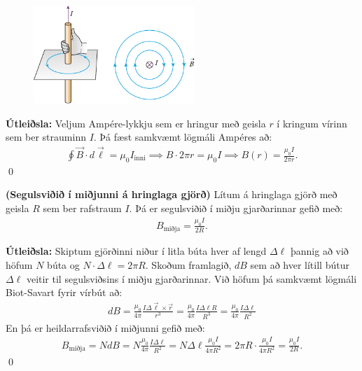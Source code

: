 \ifdefined \wholebook \else\documentclass[oneside]{book}\usepackage{EdlBook}\graphicspath{{figures/}}
\begin{document}
\begin{minipage}{\linewidth}

\begin{figure}
\vspace{-0.5cm}
\includegraphics[width = 2.4in]{figures/ampere2.pdf}
\end{figure}

\textbf{Útleiðsla:} Veljum Ampére-lykkju sem er hringur með geisla $r$ í kringum vírinn sem ber strauminn $I$. Þá fæst samkvæmt lögmáli Ampéres að:
\begin{align*}
    \oint \vec{B} \cdot d\vec{\ell} = \mu_0 I_{\text{inni}} \implies B \cdot 2\pi r = \mu_0 I \implies B(r) = \frac{\mu_0 I}{2\pi r}.
\end{align*}
\qed
\end{minipage}

\vspace{1.5cm}

\begin{tcolorbox}
\begin{theorem}
\textbf{(Segulsviðið í miðjunni á hringlaga gjörð)} Lítum á hringlaga gjörð með geisla $R$ sem ber rafstraum $I$. Þá er segulsviðið í miðju gjarðarinnar gefið með:
\begin{align*}
    B_{\text{miðja}} = \frac{\mu_0 I}{2R}.
\end{align*}
\end{theorem}
\end{tcolorbox}


\textbf{Útleiðsla:} Skiptum gjörðinni niður í litla búta hver af lengd $\Delta \ell$ þannig að við höfum $N$ búta og $N \cdot \Delta \ell = 2\pi R$. Skoðum framlagið, $dB$ sem að hver lítill bútur $\Delta \ell$ veitir til segulsviðsins í miðju gjarðarinnar. Við höfum þá samkvæmt lögmáli Biot-Savart fyrir vírbút að:
\begin{align*}
    dB = \frac{\mu_0}{4\pi} \frac{I \Delta \vec{\ell} \times \vec{r}}{r^3} = \frac{\mu_0}{4\pi} \frac{I \Delta \ell R}{R^3} = \frac{\mu_0}{4\pi} \frac{I \Delta \ell}{R^2}
\end{align*}
En þá er heildarrafsviðið í miðjunni gefið með:
\begin{align*}
    B_{\text{miðja}} = N dB = N \frac{\mu_0}{4\pi} \frac{I \Delta \ell}{R^2} = N \Delta \ell \frac{\mu_0 I}{4\pi R^2} = 2\pi R \cdot \frac{\mu_0 I}{4\pi R^2} = \frac{\mu_0 I}{2 R}.
\end{align*}
\qed
\end{document}
